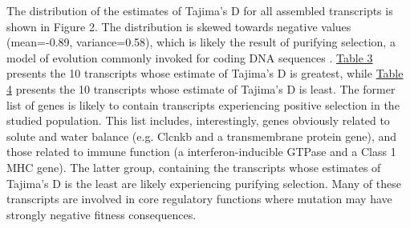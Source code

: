 \documentclass[11pt]{article}
\begin{document}
The distribution of the estimates of Tajima's D for all assembled transcripts is shown in Figure 2. The distribution is skewed towards negative values (mean=-0.89, variance=0.58), which is likely the result of purifying selection, a model of evolution commonly invoked for coding DNA sequences \cite{Chamary:2006db}. \hyperlink{Table 3}{Table 3} presents the 10 transcripts whose estimate of Tajima's D is greatest, while \hyperlink{Table 4}{Table 4} presents the 10 transcripts whose estimate of Tajima's D is least. The former list of genes is likely to contain transcripts experiencing positive selection in the studied population. This list includes, interestingly, genes obviously related to solute and water balance (e.g. Clcnkb and a transmembrane protein gene), and those related to immune function (a interferon-inducible GTPase and a Class 1 MHC gene). The latter group, containing the transcripts whose estimates of Tajima's D is the least are likely experiencing purifying selection. Many of these transcripts are involved in core regulatory functions where mutation may have strongly negative fitness consequences. \\

\vspace{10mm}
\end{document}
